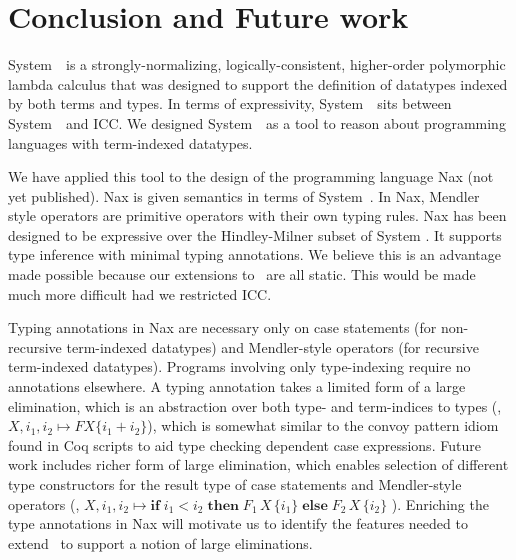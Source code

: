 \section{Conclusion and Future work}
\label{sec:concl}

System~\Fi\ is a strongly-normalizing, logically-consistent, higher-order
polymorphic lambda calculus that was designed to support the
definition of datatypes indexed by both terms and types.
In terms of expressivity, System~\Fi\ sits between System~\Fw\ and ICC.
We designed System~\Fi\ as a tool to reason about programming
languages with term-indexed datatypes. 

We have applied this tool to the design of the programming language Nax (not yet published).
Nax is given semantics in terms of System~\Fi . In Nax, Mendler style operators
are primitive operators with their own typing rules. Nax has been designed to
be expressive over the Hindley-Milner subset of System \Fi. It supports type
inference with minimal typing annotations. We believe this is an advantage
made possible because our extensions to \Fw\ are all static. This would be made
much more difficult had we restricted ICC.

Typing annotations in Nax are necessary only
on case statements (for non-recursive term-indexed datatypes)
and Mendler-style operators (for recursive term-indexed datatypes).
Programs involving only type-indexing require no annotations elsewhere.
A typing annotation takes a limited form of a large elimination,
which is an abstraction over both type- and term-indices to types
(\eg, $X,i_1,i_2 \mapsto F X \{i_1 + i_2\}$), which is somewhat similar to
the convoy pattern idiom \cite{cpdt} found in Coq scripts to aid
type checking dependent case expressions.
Future work includes richer form of large elimination, which enables selection
of different type constructors for the result type of case statements
and Mendler-style operators (\eg, 
 $X,i_1,i_2 \mapsto \textbf{if}\;i_1<i_2\;
	\textbf{then}\; F_1\,X\,\{i_1\}\;\textbf{else}\;F_2\, X\,\{i_2\}$ ).
Enriching the type annotations in Nax will motivate us to identify
the features needed to extend \Fi\ to support a notion of large eliminations.

 
